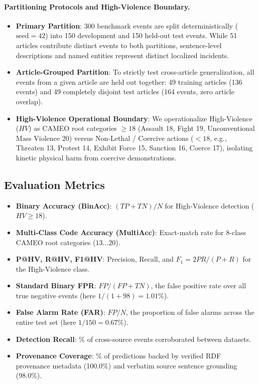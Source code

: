 \documentclass[11pt,a4paper]{article}
\begin{document}
\paragraph{Partitioning Protocols and High-Violence Boundary.}
\begin{itemize}
  \item \textbf{Primary Partition}: 300 benchmark events are split deterministically ($\text{seed}=42$) into 150 development and 150 held-out test events. While 51 articles contribute distinct events to both partitions, sentence-level descriptions and named entities represent distinct localized incidents.
  \item \textbf{Article-Grouped Partition}: To strictly test cross-article generalization, all events from a given article are held out together: 49 training articles (136 events) and 49 completely disjoint test articles (164 events, zero article overlap).
  \item \textbf{High-Violence Operational Boundary}: We operationalize High-Violence ($HV$) as CAMEO root categories $\ge 18$ (Assault 18, Fight 19, Unconventional Mass Violence 20) versus Non-Lethal / Coercive actions ($< 18$, e.g., Threaten 13, Protest 14, Exhibit Force 15, Sanction 16, Coerce 17), isolating kinetic physical harm from coercive demonstrations.
\end{itemize}

\subsection{Evaluation Metrics}

\begin{itemize}
  \item \textbf{Binary Accuracy (BinAcc)}: $(TP + TN) / N$ for High-Violence detection ($HV \ge 18$).
  \item \textbf{Multi-Class Code Accuracy (MultiAcc)}: Exact-match rate for 8-class CAMEO root categories ($13 \dots 20$).
  \item \textbf{P@HV, R@HV, F1@HV}: Precision, Recall, and $F_1 = 2PR/(P+R)$ for the High-Violence class.
  \item \textbf{Standard Binary FPR}: $FP / (FP + TN)$, the false positive rate over all true negative events (here $1/(1+98) = 1.01\%$).
  \item \textbf{False Alarm Rate (FAR)}: $FP / N$, the proportion of false alarms across the entire test set (here $1/150 = 0.67\%$).
  \item \textbf{Detection Recall}: \% of cross-source events corroborated between datasets.
  \item \textbf{Provenance Coverage}: \% of predictions backed by verified RDF provenance metadata (100.0\%) and verbatim source sentence grounding (98.0\%).
\end{itemize}
\end{document}
